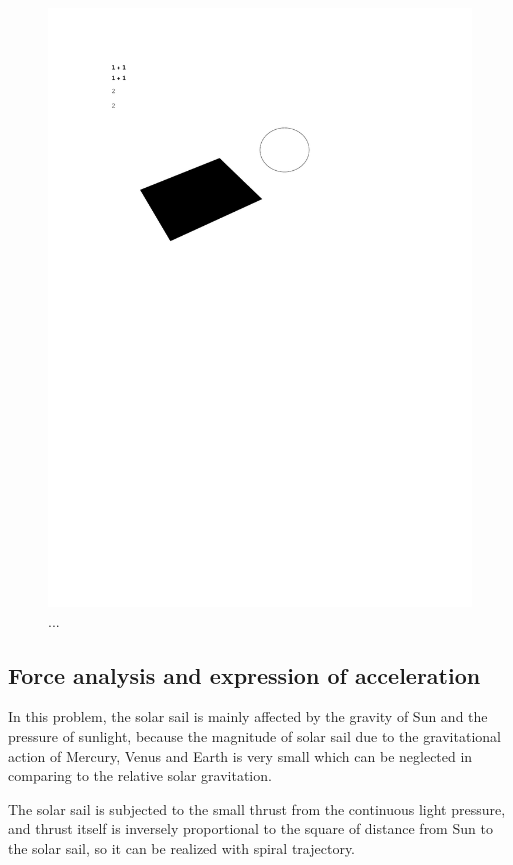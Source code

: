 \documentclass[../Paper.tex]{subfiles}
\begin{document}
\begin{figure}[H]
 \centering
 \includegraphics[scale=0.3]{../Figures/1.pdf}
 \caption{...}
\end{figure}

\subsection{Force analysis and expression of acceleration}

In this problem, the solar sail is mainly affected by the gravity of Sun and the pressure of sunlight, because the magnitude of solar sail due to the gravitational action of Mercury, Venus and Earth is very small which can be neglected in comparing to the relative solar gravitation.

The solar sail is subjected to the small thrust from the continuous light pressure, and thrust itself is inversely proportional to the square of distance from Sun to the solar sail, so it can be realized with spiral trajectory.      
\end{document}
